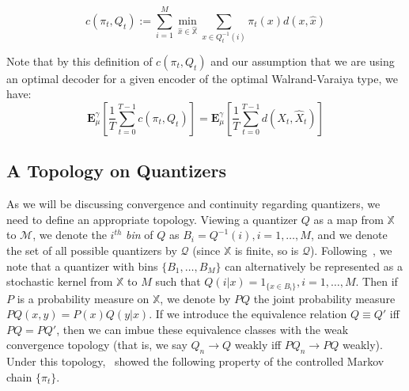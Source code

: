 \documentclass[conference]{IEEEtran}
\begin{document}
\begin{equation}\label{eq:cost}
    c(\pi_t, Q_t) := \sum_{i=1}^M \min_{\hat{x} \in \hat{\mathbb{X}}} \sum_{x \in Q_t^{-1}(i)} \pi_t(x)d(x,\hat{x})
\end{equation}

Note that by this definition of \( c(\pi_t,Q_t) \) and our assumption that we are using an optimal decoder for a given encoder of the optimal Walrand-Varaiya type, we have:
\[\mathbf{E}_{\mu}^{\gamma}\left[\frac{1}{T}\sum_{t=0}^{T-1}c(\pi_t,Q_t)\right] = \mathbf{E}_{\mu}^{\gamma}\left[\frac{1}{T}\sum_{t=0}^{T-1}d(X_t,\hat{X}_t)\right]\]


\subsection{A Topology on Quantizers}
As we will be discussing convergence and continuity regarding quantizers, we need to define an appropriate topology. Viewing a quantizer \( Q \) as a map from \( \mathbb{X} \) to \( \mathcal{M} \), we denote the \( i^{th} \) \emph{bin} of \( Q \) as \( B_i = Q^{-1}(i), i=1,\ldots,M \), and we denote the set of all possible quantizers by \( \mathcal{Q} \) (since \(\mathbb{X}\) is finite, so is \(\mathcal{Q}\)). Following~\cite{YukselOptimizationofChannels,Linder}, we note that a quantizer with bins \( \{B_1,\ldots,B_M\} \) can alternatively be represented as a stochastic kernel from \( \mathbb{X} \) to \( M \) such that \( Q(i|x) = 1_{\{x \in B_i\}}, i=1,\ldots,M \). Then if \( P \) is a probability measure on \( \mathbb{X} \), we denote by \( PQ \) the joint probability measure \( PQ(x,y) = P(x)Q(y|x) \). If we introduce the equivalence relation \( Q \equiv Q' \) iff \( PQ = PQ' \), then we can imbue these equivalence classes with the weak convergence topology (that is, we say \( Q_n \to Q \) weakly iff \( PQ_n \to PQ \) weakly). Under this topology,~\cite{Linder} showed the following property of the controlled Markov chain \( \{\pi_t\} \).
\end{document}

